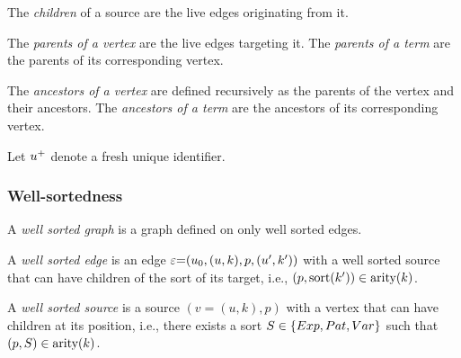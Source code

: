 \begin{definition}
  The \emph{children} of a source are the live edges originating from it.
\end{definition}

\begin{definition}
  The \emph{parents of a vertex} are the live edges targeting it.
  The \emph{parents of a term} are the parents of its corresponding vertex.
\end{definition}

\begin{definition}
  The \emph{ancestors of a vertex} are defined recursively as the parents of the vertex and their ancestors.
  The \emph{ancestors of a term} are the ancestors of its corresponding vertex.
\end{definition}

Let ${u}^{+}$ denote a fresh unique identifier.


\subsubsection{Well-sortedness}

\begin{definition}
  A \emph{well sorted graph} is a graph defined on only well sorted edges.
\end{definition}

\begin{definition}
  A \emph{well sorted edge} is an edge $\varepsilon{=}(u_0, (u, k), p, (u', k'))$
  with a well sorted source that can have children of the sort of its target,
  i.e., $(p, \operatorname{\text{sort}}\mathopen{}\left(k'\right)\mathclose{}) \in \operatorname{\text{arity}}\mathopen{}\left(k\right)\mathclose{}$.
\end{definition}

\begin{definition}
  A \emph{well sorted source} is a source $(v{=}(u, k), p)$
  with a vertex that can have children at its position,
  i.e., there exists a sort $S \in \left\{Exp, Pat, Var\right\}$ such that $(p, S) \in \operatorname{\text{arity}}\mathopen{}\left(k\right)\mathclose{}$.
\end{definition}


